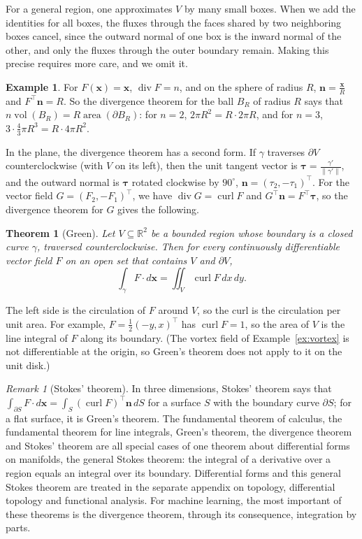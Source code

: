 \documentclass[11pt]{article}
\newcommand{\norm}[1]{\lVert #1 \rVert}
\theoremstyle{definition}
\newtheorem{example}[definition]{Example}
\theoremstyle{plain}
\newtheorem{theorem}[definition]{Theorem}
\theoremstyle{remark}
\newtheorem{remark}[definition]{Remark}
\DeclareMathOperator{\Div}{div}
\DeclareMathOperator{\curl}{curl}
\DeclareMathOperator{\vol}{vol}
\DeclareMathOperator{\area}{area}
\begin{document}
For a general region, one approximates $V$ by many small boxes. When we add the identities for all boxes, the fluxes through the faces shared by two neighboring boxes cancel, since the outward normal of one box is the inward normal of the other, and only the fluxes through the outer boundary remain. Making this precise requires more care, and we omit it.

\begin{example}\label{ex:divergence-theorem}
    For $F(\mathbf{x}) = \mathbf{x}$, $\Div F = n$, and on the sphere of radius $R$, $\mathbf{n} = \frac{\mathbf{x}}{R}$ and $F^\top\mathbf{n} = R$. So the divergence theorem for the ball $B_R$ of radius $R$ says that $n\vol(B_R) = R\area(\partial B_R)$: for $n = 2$, $2\pi R^2 = R \cdot 2\pi R$, and for $n = 3$, $3 \cdot \frac{4}{3}\pi R^3 = R \cdot 4\pi R^2$.
\end{example}

In the plane, the divergence theorem has a second form. If $\gamma$ traverses $\partial V$ counterclockwise (with $V$ on its left), then the unit tangent vector is $\boldsymbol{\tau} = \frac{\gamma'}{\norm{\gamma'}}$, and the outward normal is $\boldsymbol{\tau}$ rotated clockwise by $90^\circ$, $\mathbf{n} = (\tau_2, -\tau_1)^\top$. For the vector field $G = (F_2, -F_1)^\top$, we have $\Div G = \curl F$ and $G^\top\mathbf{n} = F^\top\boldsymbol{\tau}$, so the divergence theorem for $G$ gives the following.

\begin{theorem}[Green]\label{thm:green}
    Let $V \subseteq \mathbb{R}^2$ be a bounded region whose boundary is a closed curve $\gamma$, traversed counterclockwise. Then for every continuously differentiable vector field $F$ on an open set that contains $V$ and $\partial V$,
    \[\int_\gamma F \cdot d\mathbf{x} = \iint_V \curl F\, dx\, dy.\]
\end{theorem}

The left side is the circulation of $F$ around $V$, so the curl is the circulation per unit area. For example, $F = \frac{1}{2}(-y, x)^\top$ has $\curl F = 1$, so the area of $V$ is the line integral of $F$ along its boundary. (The vortex field of Example~\ref{ex:vortex} is not differentiable at the origin, so Green's theorem does not apply to it on the unit disk.)

\begin{remark}[Stokes' theorem]
    In three dimensions, Stokes' theorem says that $\int_{\partial S} F \cdot d\mathbf{x} = \int_S (\curl F)^\top\mathbf{n}\, dS$ for a surface $S$ with the boundary curve $\partial S$; for a flat surface, it is Green's theorem. The fundamental theorem of calculus, the fundamental theorem for line integrals, Green's theorem, the divergence theorem and Stokes' theorem are all special cases of one theorem about differential forms on manifolds, the general Stokes theorem: the integral of a derivative over a region equals an integral over its boundary. Differential forms and this general Stokes theorem are treated in the separate appendix on topology, differential topology and functional analysis. For machine learning, the most important of these theorems is the divergence theorem, through its consequence, integration by parts.
\end{remark}
\end{document}

